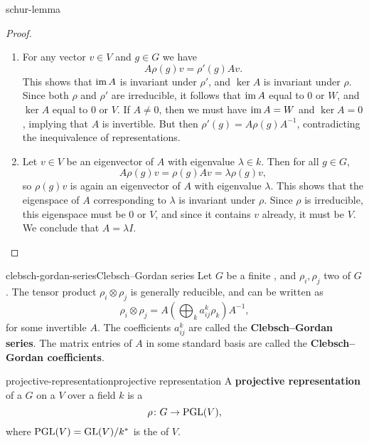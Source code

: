 \begin{example}{schur-lemma}
    \begin{proof}
    \begin{enumerate}[label=(\roman*)]
        \item For any vector $v \in V$ and $g \in G$ we have
        \[ A \rho(g) v = \rho'(g) A v . \]
        This shows that $\operatorname{im} A$ is invariant under $\rho'$, and $\ker A$ is invariant under $\rho$. Since both $\rho$ and $\rho'$ are irreducible, it follows that $\operatorname{im} A$ equal to $0$ or $W$, and $\ker A$ equal to $0$ or $V$. If $A \ne 0$, then we must have $\operatorname{im} A = W$ and $\ker A = 0$, implying that $A$ is invertible. But then $\rho'(g) = A \rho(g) A^{-1}$, contradicting the inequivalence of representations.
        \item Let $v \in V$ be an eigenvector of $A$ with eigenvalue $\lambda \in k$. Then for all $g \in G$,
        \[ A \rho(g) v = \rho(g) A v = \lambda \rho(g) v , \]
        so $\rho(g) v$ is again an eigenvector of $A$ with eigenvalue $\lambda$. This shows that the eigenspace of $A$ corresponding to $\lambda$ is invariant under $\rho$. Since $\rho$ is irreducible, this eigenspace must be $0$ or $V$, and since it contains $v$ already, it must be $V$. We conclude that $A = \lambda I$.
    \end{enumerate}
    \end{proof}
\end{example}

\begin{topic}{clebsch-gordan-series}{Clebsch--Gordan series}
    Let $G$ be a finite , and $\rho_i, \rho_j$ two   of $G$. The tensor product $\rho_i \otimes \rho_j$ is generally reducible, and can be written as
    \[ \rho_i \otimes \rho_j = A \left( \bigoplus_k a^k_{ij} \rho_k \right) A^{-1} , \]
    for some invertible $A$. The coefficients $a^k_{ij}$ are called the \textbf{Clebsch--Gordan series}. The matrix entries of $A$ in some standard basis are called the \textbf{Clebsch--Gordan coefficients}.
\end{topic}

\begin{topic}{projective-representation}{projective representation}
    A \textbf{projective representation} of a  $G$ on a  $V$ over a field $k$ is a 
    \[ \rho \colon G \to \textup{PGL}(V) , \]
    where $\textup{PGL}(V) = \textup{GL}(V) / k^*$ is the  of $V$.
\end{topic}

